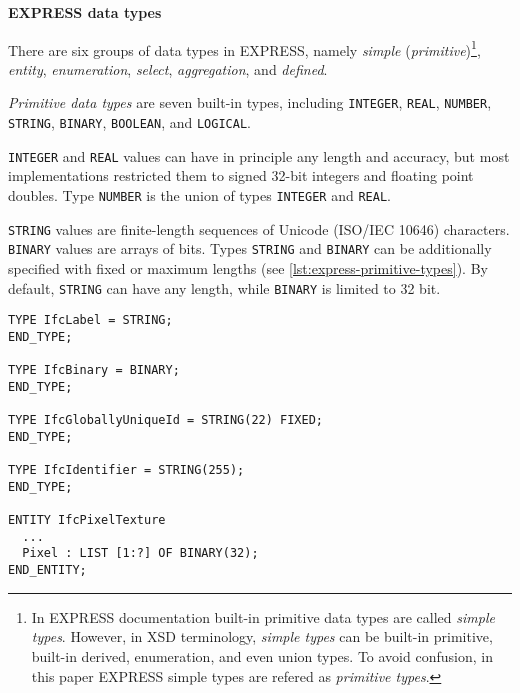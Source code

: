 \noindent\textbf{EXPRESS data types}

There are six groups of data types in EXPRESS, namely \emph{simple} (\emph{primitive})\footnote{
    In EXPRESS documentation built-in primitive data types are called \emph{simple types}.
    However, in XSD terminology, \emph{simple types} can be built-in primitive, built-in derived, enumeration, and even union types.
    To avoid confusion, in this paper EXPRESS simple types are refered as \emph{primitive types}.
}, \emph{entity}, \emph{enumeration}, \emph{select}, \emph{aggregation}, and \emph{defined}.

% 
% 
\emph{Primitive data types} are seven built-in types, including \texttt{IN\-TE\-GER}, \texttt{REAL}, \texttt{NUM\-BER}, \texttt{STRING}, \texttt{BI\-NA\-RY}, \texttt{BOOL\-EAN}, and \texttt{LOG\-I\-CAL}.

\texttt{INTEGER} and \texttt{REAL} values can have in principle any length and accuracy, but most implementations restricted them to signed 32-bit integers
and floating point doubles.
Type \texttt{NUM\-BER} is the union of types \texttt{IN\-TE\-GER} and \texttt{REAL}.

\texttt{STRING} values are finite-length sequences of Unicode (ISO/IEC 10646) characters.
\texttt{BINARY} values are arrays of bits.
Types \texttt{STRING} and \texttt{BINARY} can be additionally specified with fixed or maximum lengths (see \autoref{lst:express-primitive-types}).
By default, \texttt{STRING} can have any length, while \texttt{BINARY} is limited to 32 bit.


\begin{lstlisting}[caption={Examples of \texttt{STRING} and \texttt{BINARY} types with default, fixed, and maximum lengths.},label=lst:express-primitive-types]
TYPE IfcLabel = STRING;
END_TYPE;

TYPE IfcBinary = BINARY;
END_TYPE;

TYPE IfcGloballyUniqueId = STRING(22) FIXED;
END_TYPE;

TYPE IfcIdentifier = STRING(255);
END_TYPE;

ENTITY IfcPixelTexture
  ...
  Pixel : LIST [1:?] OF BINARY(32);
END_ENTITY;
\end{lstlisting}



